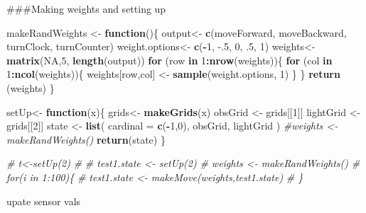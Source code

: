 \documentclass[]{article}
\newenvironment{Shaded}{\begin{snugshade}}{\end{snugshade}}
\newcommand{\CommentTok}[1]{\textcolor[rgb]{0.56,0.35,0.01}{\textit{#1}}}
\newcommand{\ControlFlowTok}[1]{\textcolor[rgb]{0.13,0.29,0.53}{\textbf{#1}}}
\newcommand{\DataTypeTok}[1]{\textcolor[rgb]{0.13,0.29,0.53}{#1}}
\newcommand{\DecValTok}[1]{\textcolor[rgb]{0.00,0.00,0.81}{#1}}
\newcommand{\FloatTok}[1]{\textcolor[rgb]{0.00,0.00,0.81}{#1}}
\newcommand{\KeywordTok}[1]{\textcolor[rgb]{0.13,0.29,0.53}{\textbf{#1}}}
\newcommand{\NormalTok}[1]{#1}
\newcommand{\OperatorTok}[1]{\textcolor[rgb]{0.81,0.36,0.00}{\textbf{#1}}}
\newcommand{\OtherTok}[1]{\textcolor[rgb]{0.56,0.35,0.01}{#1}}
\newcommand{\StringTok}[1]{\textcolor[rgb]{0.31,0.60,0.02}{#1}}
\begin{document}
\#\#\#Making weights and setting up

\begin{Shaded}
\begin{Highlighting}[]
\NormalTok{makeRandWeights <-}\StringTok{ }\ControlFlowTok{function}\NormalTok{()\{}
\NormalTok{  output<-}\StringTok{ }\KeywordTok{c}\NormalTok{(moveForward, moveBackward, turnClock, turnCounter)}
\NormalTok{  weight.options<-}\StringTok{ }\KeywordTok{c}\NormalTok{(}\OperatorTok{-}\DecValTok{1}\NormalTok{, }\FloatTok{-.5}\NormalTok{, }\DecValTok{0}\NormalTok{, }\FloatTok{.5}\NormalTok{, }\DecValTok{1}\NormalTok{)}
\NormalTok{  weights<-}\StringTok{ }\KeywordTok{matrix}\NormalTok{(}\OtherTok{NA}\NormalTok{,}\DecValTok{5}\NormalTok{, }\KeywordTok{length}\NormalTok{(output))}
  \ControlFlowTok{for}\NormalTok{ (row }\ControlFlowTok{in} \DecValTok{1}\OperatorTok{:}\KeywordTok{nrow}\NormalTok{(weights))\{}
    \ControlFlowTok{for}\NormalTok{ (col }\ControlFlowTok{in} \DecValTok{1}\OperatorTok{:}\KeywordTok{ncol}\NormalTok{(weights))\{}
\NormalTok{    weights[row,col] <-}\StringTok{ }\KeywordTok{sample}\NormalTok{(weight.options, }\DecValTok{1}\NormalTok{)}
\NormalTok{    \}}
\NormalTok{  \}}
  \KeywordTok{return}\NormalTok{ (weights)}
\NormalTok{\}}


\NormalTok{setUp<-}\StringTok{ }\ControlFlowTok{function}\NormalTok{(x)\{}
\NormalTok{  grids<-}\StringTok{ }\KeywordTok{makeGrids}\NormalTok{(x)}
\NormalTok{  obsGrid <-}\StringTok{ }\NormalTok{grids[[}\DecValTok{1}\NormalTok{]]}
\NormalTok{  lightGrid <-}\StringTok{ }\NormalTok{grids[[}\DecValTok{2}\NormalTok{]]}
\NormalTok{  state <-}\StringTok{ }\KeywordTok{list}\NormalTok{(}
    \DataTypeTok{cardinal =} \KeywordTok{c}\NormalTok{(}\OperatorTok{-}\DecValTok{1}\NormalTok{,}\DecValTok{0}\NormalTok{),}
\NormalTok{    obsGrid,}
\NormalTok{    lightGrid}
\NormalTok{  )}
  \CommentTok{#weights <- makeRandWeights()}
  \KeywordTok{return}\NormalTok{(state)}
\NormalTok{\}}

\CommentTok{# t<-setUp(2)}
\CommentTok{# }
\CommentTok{# test1.state <- setUp(2)}
\CommentTok{# weights <- makeRandWeights()}
\CommentTok{# for(i in 1:100)\{}
\CommentTok{#   test1.state <- makeMove(weights,test1.state)}
\CommentTok{# \}}
\end{Highlighting}
\end{Shaded}

upate sensor vals
\end{document}
